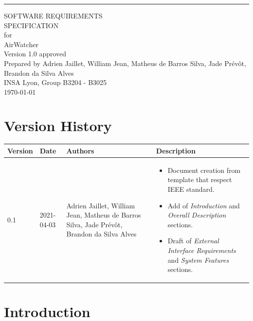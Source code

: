\documentclass{report}
\def\myversion{1.0 }
\def\authors{Adrien Jaillet, William Jean, Matheus de Barros Silva, Jade Prévôt, Brandon da Silva Alves}
\def\project{AirWatcher}
\def\organization{INSA Lyon, Group B3204 - B3025}
\begin{document}
\begin{flushright}
	\rule{16cm}{5pt}\vskip1cm
	\begin{bfseries}
		\Huge{SOFTWARE REQUIREMENTS\\ SPECIFICATION}\\
		\vspace{1.9cm}
		for\\
		\vspace{1.9cm}
		\project\\
		\vspace{1.9cm}
		\LARGE{Version \myversion approved}\\
		\vspace{1.9cm}
		Prepared by \authors\\
		\vspace{1.9cm}
		\organization\\
		\vspace{1.9cm}
		\today\\
	\end{bfseries}
\end{flushright}

\tableofcontents
\listoffigures
\listoftables

\chapter*{Version History}

\begin{center}
	\begin{tabular}{|m{1.5cm}|m{1.7cm}|m{4cm}|m{7.3cm}|}
		\hline
		\textbf{Version} & \textbf{Date} & \textbf{Authors} & \textbf{Description}\\
		\hline
		0.1 &
		2021-04-03 &
		\authors &
		\begin{itemize}
			\item Document creation from template that respect IEEE standard.
			\item Add of \textit{Introduction} and \textit{Overall Description}
			sections.
			\item Draft of \textit{External Interface Requirements} and
			\textit{System Features} sections.
	\end{itemize}\\
		\hline
	\end{tabular}
\end{center}

\chapter{Introduction}
\end{document}
